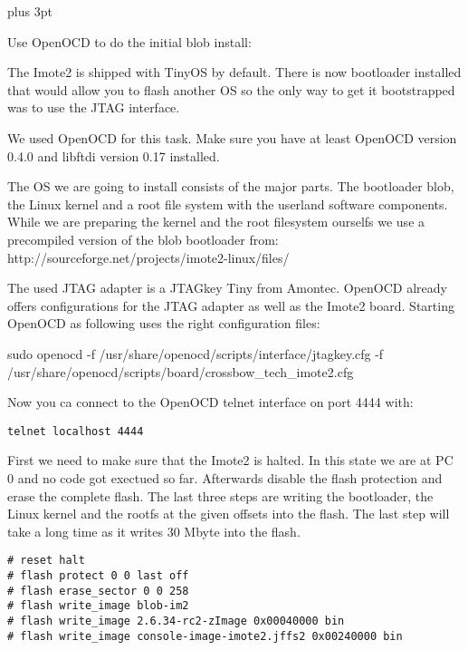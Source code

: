 \parindent=0pt                   %
\parskip=6pt plus 3pt            %

\label{annexopenocd}

Use OpenOCD to do the initial blob install:

The Imote2 is shipped with TinyOS by default. There is now bootloader installed
that would allow you to flash another OS so the only way to get it bootstrapped
was to use the JTAG interface.

We used OpenOCD for this task. Make sure you have at least OpenOCD version 0.4.0
and libftdi version 0.17 installed.

The OS we are going to install consists of the major parts. The bootloader blob, the
Linux kernel and a root file system with the userland software components. While
we are preparing the kernel and the root filesystem ourselfs we use a
precompiled version of the blob bootloader from:
http://sourceforge.net/projects/imote2-linux/files/

The used JTAG adapter is a JTAGkey Tiny from Amontec. OpenOCD already offers
configurations for the JTAG adapter as well as the Imote2 board. Starting
OpenOCD as following uses the right configuration files:

sudo openocd -f /usr/share/openocd/scripts/interface/jtagkey.cfg -f \\
/usr/share/openocd/scripts/board/crossbow\_tech\_imote2.cfg

Now you ca connect to the OpenOCD telnet interface on port 4444 with:

\begin{verbatim}
telnet localhost 4444
\end{verbatim}

First we need to make sure that the Imote2 is halted. In this state we are at PC
0 and no code got exectued so far. Afterwards disable the flash protection and
erase the complete flash. The last three steps are writing the bootloader, the
Linux kernel and the rootfs at the given offsets into the flash. The last step
will take a long time as it writes 30 Mbyte into the flash.

\begin{verbatim}
# reset halt
# flash protect 0 0 last off
# flash erase_sector 0 0 258
# flash write_image blob-im2
# flash write_image 2.6.34-rc2-zImage 0x00040000 bin
# flash write_image console-image-imote2.jffs2 0x00240000 bin
\end{verbatim}
